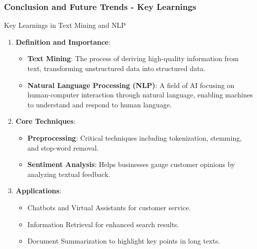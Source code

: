 \documentclass[aspectratio=169]{beamer}
\begin{document}
\begin{frame}[fragile]
    \frametitle{Conclusion and Future Trends - Key Learnings}
    
    \begin{block}{Key Learnings in Text Mining and NLP}
        \begin{enumerate}
            \item \textbf{Definition and Importance}:
            \begin{itemize}
                \item \textbf{Text Mining}: The process of deriving high-quality information from text, transforming unstructured data into structured data.
                \item \textbf{Natural Language Processing (NLP)}: A field of AI focusing on human-computer interaction through natural language, enabling machines to understand and respond to human language.
            \end{itemize}
            
            \item \textbf{Core Techniques}:
            \begin{itemize}
                \item \textbf{Preprocessing}: Critical techniques including tokenization, stemming, and stop-word removal.
                \item \textbf{Sentiment Analysis}: Helps businesses gauge customer opinions by analyzing textual feedback.
            \end{itemize}
            
            \item \textbf{Applications}:
            \begin{itemize}
                \item Chatbots and Virtual Assistants for customer service.
                \item Information Retrieval for enhanced search results.
                \item Document Summarization to highlight key points in long texts.
            \end{itemize}
        \end{enumerate}
    \end{block}
\end{frame}
\end{document}
